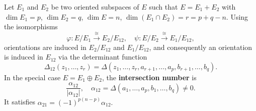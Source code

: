 Let $E_1$ and $E_2$ be two oriented subspaces of $E$ such that $E = E_1 + E_2$ with $\dim E_1 = p$, $\dim E_2 = q$, $\dim E = n$, $\dim(E_1 \cap E_2) = r = p+q-n$. Using the isomorphisms
$$\varphi: E/E_1 \xrightarrow{\cong} E_2/E_{12}, \quad \psi: E/E_2 \xrightarrow{\cong} E_1/E_{12},$$
orientations are induced in $E_2/E_{12}$ and $E_1/E_{12}$, and consequently an orientation is induced in $E_{12}$ via the determinant function
$$\Delta_{12}(z_1, \ldots, z_r) = \Delta(z_1, \ldots, z_r, a_{r+1}, \ldots, a_p, b_{r+1}, \ldots, b_q).$$
In the special case $E = E_1 \oplus E_2$, the \textbf{intersection number} is
$$\frac{\alpha_{12}}{|\alpha_{12}|}, \quad \alpha_{12} = \Delta(a_1, \ldots, a_p, b_1, \ldots, b_q) \neq 0.$$
It satisfies $\alpha_{21} = (-1)^{p(n-p)} \alpha_{12}.$

